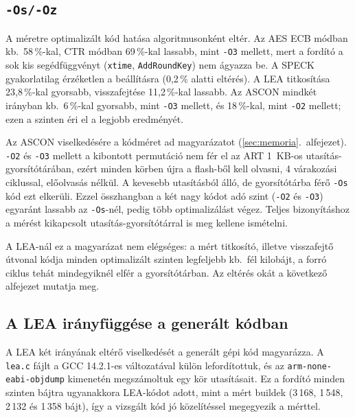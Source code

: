 \documentclass[a4paper,12pt]{report}
\theoremstyle{definition}
\theoremstyle{remark}
\begin{document}
\subsection{\texttt{-Os/-Oz}}

A méretre optimalizált kód hatása algoritmusonként eltér. Az AES ECB módban kb.\ 58\,\%-kal, CTR módban 69\,\%-kal lassabb, mint \texttt{-O3} mellett, mert a fordító a sok kis segédfüggvényt (\texttt{xtime}, \texttt{AddRoundKey}) nem ágyazza be. A SPECK gyakorlatilag érzéketlen a beállításra (0,2\,\% alatti eltérés). A LEA titkosítása 23,8\,\%-kal gyorsabb, visszafejtése 11,2\,\%-kal lassabb. Az ASCON mindkét irányban kb.\ 6\,\%-kal gyorsabb, mint \texttt{-O3} mellett, és 18\,\%-kal, mint \texttt{-O2} mellett; ezen a szinten éri el a legjobb eredményét.

Az ASCON viselkedésére a kódméret ad magyarázatot (\ref{sec:memoria}.~alfejezet). \texttt{-O2} és \texttt{-O3} mellett a kibontott permutáció nem fér el az ART 1~KB-os utasítás-gyorsítótárában, ezért minden körben újra a flash-ből kell olvasni, 4 várakozási ciklussal, előolvasás nélkül. A kevesebb utasításból álló, de gyorsítótárba férő \texttt{-Os} kód ezt elkerüli. Ezzel összhangban a két nagy kódot adó szint (\texttt{-O2} és \texttt{-O3}) egyaránt lassabb az \texttt{-Os}-nél, pedig több optimalizálást végez. Teljes bizonyításhoz a mérést kikapcsolt utasítás-gyorsítótárral is meg kellene ismételni.

A LEA-nál ez a magyarázat nem elégséges: a mért titkosító, illetve visszafejtő útvonal kódja minden optimalizált szinten legfeljebb kb.\ fél kilobájt, a forró ciklus tehát mindegyiknél elfér a gyorsítótárban. Az eltérés okát a következő alfejezet mutatja meg.

\subsection{A LEA irányfüggése a generált kódban}\label{sec:lea_asm}

A LEA két irányának eltérő viselkedését a generált gépi kód magyarázza. A \texttt{lea.c} fájlt a GCC 14.2.1-es változatával külön lefordítottuk, és az \texttt{arm-none-eabi-objdump} kimenetén megszámoltuk egy kör utasításait. Ez a fordító minden szinten bájtra ugyanakkora LEA-kódot adott, mint a mért buildek (3\,168, 1\,548, 2\,132 és 1\,358 bájt), így a vizsgált kód jó közelítéssel megegyezik a mérttel.
\end{document}
